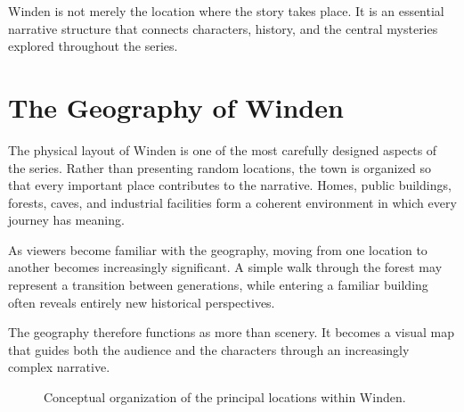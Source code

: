 \documentclass[12pt,oneside,openany]{book}
\begin{document}
\begin{tcolorbox}[colback=gray!8,colframe=black,title=Key Observation]
Winden is not merely the location where the story takes place. It is an essential narrative structure that connects characters, history, and the central mysteries explored throughout the series.
\end{tcolorbox}
\section{The Geography of Winden}

The physical layout of Winden is one of the most carefully designed aspects of
the series. Rather than presenting random locations, the town is organized so
that every important place contributes to the narrative. Homes, public
buildings, forests, caves, and industrial facilities form a coherent
environment in which every journey has meaning.

As viewers become familiar with the geography, moving from one location to
another becomes increasingly significant. A simple walk through the forest may
represent a transition between generations, while entering a familiar building
often reveals entirely new historical perspectives.

The geography therefore functions as more than scenery. It becomes a visual map
that guides both the audience and the characters through an increasingly
complex narrative.

\begin{figure}[H]
\centering
{}
\caption{Conceptual organization of the principal locations within Winden.}
\end{figure}
\end{document}

